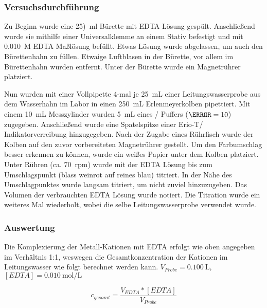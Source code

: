 \documentclass{article}
\begin{document}
      \subsubsection{Versuchsdurchführung} \label{sec:Versucharte}
        Zu Beginn wurde eine \SI[mode=text,separate-uncertainty=true]{25)}{\milli\litre} Bürette mit EDTA Lösung gespült. Anschließend wurde sie mithilfe einer Universalklemme an einem Stativ befestigt und mit \SI[mode=text]{0.010}{M} EDTA Maßlösung befüllt. Etwas Lösung wurde abgelassen, um auch den Bürettenhahn zu füllen. Etwaige Luftblasen in der Bürette, vor allem im Bürettenhahn wurden entfernt. Unter der Bürette wurde ein Magnetrührer platziert. 
        
        Nun wurden mit einer Vollpipette 4-mal je \SI[mode=text]{25}{\milli\liter} einer Leitungswasserprobe aus dem Wasserhahn im Labor in einen \SI[mode=text]{250}{\milli\liter} Erlenmeyerkolben pipettiert. Mit einem \SI[mode=text]{10}{\milli\liter} Messzylinder wurden \SI[mode=text]{5}{\milli\liter} eines / Puffers ($\pH=10$) zugegeben. Anschließend wurde eine Spatelspitze einer Erio-T/ Indikatorverreibung hinzugegeben. Nach der Zugabe eines Rührfisch wurde der Kolben auf den zuvor vorbereiteten Magnetrührer gestellt. Um den Farbumschlag besser erkennen zu können, wurde ein weißes Papier unter dem Kolben platziert.  Unter Rühren (ca. \SI[mode=text]{70}{rpm}) wurde mit der EDTA Lösung bis zum Umschlagspunkt (blass weinrot auf reines blau) titriert. In der Nähe des Umschlagpunktes wurde langsam titriert, um nicht zuviel hinzuzugeben. Das Volumen der verbrauchten EDTA Lösung wurde notiert. Die Titration wurde ein weiteres Mal wiederholt, wobei die selbe Leitungswasserprobe verwendet wurde.
        
      \subsubsection{Auswertung}
        
        Die Komplexierung der Metall-Kationen mit EDTA erfolgt wie oben angegeben im Verhältnis 1:1, weswegen die Gesamtkonzentration der Kationen im Leitungswasser wie folgt berechnet werden kann. $V_{Probe} = \SI[mode=text]{0.100}{\liter}$, $[EDTA] = \SI[mode=text]{0.010}{\mole\per\liter}$
        
        \begin{equation}
           c_{gesamt} = \frac{V_{EDTA} * [EDTA]}{V_{Probe}} \label{eq:ED}
        \end{equation}
         
\end{document}
